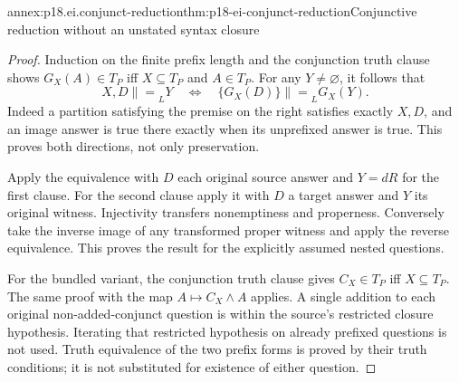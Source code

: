 \begin{annexitem}{annex:p18.ei.conjunct-reduction}{thm:p18-ei-conjunct-reduction}{Conjunctive reduction without an unstated syntax closure}
\begin{proof}
Induction on the finite prefix length and the conjunction truth clause shows
\(G_X(A)\in T_P\) iff \(X\subseteq T_P\) and \(A\in T_P\).
For any \(Y\ne\varnothing\), it follows that
\[
 X,D\mathrel{\|=}_L Y
 \quad\Longleftrightarrow\quad
 \{G_X(D)\}\mathrel{\|=}_L G_X(Y).
\]
Indeed a partition satisfying the premise on the right satisfies exactly
\(X,D\), and an image answer is true there exactly when its unprefixed
answer is true. This proves both directions, not only preservation.

Apply the equivalence with \(D\) each original source answer and \(Y=dR\)
for the first clause. For the second clause apply it with \(D\) a target
answer and \(Y\) its original witness. Injectivity transfers nonemptiness
and properness. Conversely take the inverse image of any transformed proper
witness and apply the reverse equivalence. This proves the result for the
explicitly assumed nested questions.

For the bundled variant, the conjunction truth clause gives
\(C_X\in T_P\) iff \(X\subseteq T_P\). The same proof with the map
\(A\mapsto C_X\land A\) applies. A single addition to each original
non-added-conjunct question is within the source's restricted closure
hypothesis. Iterating that restricted hypothesis on already prefixed questions
is not used. Truth equivalence of the two prefix forms is proved by their
truth conditions; it is not substituted for existence of either question.
\end{proof}
\end{annexitem}

